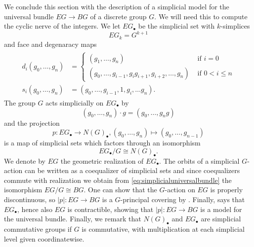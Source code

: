 We conclude this section with the description of a simplicial model
for the universal bundle $EG\to BG$ of a discrete group $G$.
We will need this to compute the cyclic nerve of the integers.
We let $EG_\bullet$ be the simplicial set with $k$-simplices
\[
EG_k = G^{k+1}
\]
and face and degenaracy maps
\begin{align}
\begin{split}
d_i(g_0,\ldots, g_n) &= 
\begin{cases}
(g_1,\ldots, g_n) &\text{ if } i = 0\\
(g_0, \ldots, g_{i-1}, g_ig_{i+1}, g_{i+2},\ldots, g_n) &\text{ if } 0<i\le n
\end{cases}\\
s_i(g_0,\ldots, g_n) &= (g_0,\ldots, g_{i-1}, 1, g_i,\ldots g_n).
\end{split}
\end{align}
The group $G$ acts simplicially on $EG_\bullet$ by
\begin{equation}
(g_0,\ldots, g_n)\cdot g = (g_0,\ldots, g_ng)
\end{equation}
and the projection
\[
p:EG_\bullet\to N(G)_\bullet, (g_0,\ldots, g_n)\mapsto (g_0,\ldots, g_{n-1})
\]
is a map of simplicial sets which factors through an isomorphism
\begin{equation}\label{eq:simplicialuniversalbundle}
EG_\bullet/G\cong N(G)_\bullet.
\end{equation}
We denote by $EG$ the geometric
realization of $EG_\bullet$. The orbits of a simplicial $G$-action
can be written as a coequalizer of simplicial sets
and since coequalizers commute with realization
we obtain from \eqref{eq:simplicialuniversalbundle}
the isomorphism $EG/G\cong BG$. One can show that the $G$-action
on $EG$ is properly discontinuous, so $|p|:EG\to BG$ is a $G$-principal covering
by \cite[Proposition~14.1.12, \pno~333]{diecktop}. 
Finally,  \cite[Lemma~4.6, \pno~290]{goerssjardine} says that
$EG_\bullet$, hence also $EG$ is contractible, showing that $|p|:EG\to BG$ is a model for
the universal bundle. Finally, we remark that $N(G)_\bullet$ and $EG_\bullet$
are simplicial commutative groups if $G$ is commutative, with multiplication at each 
simplicial level given coordinatewise.
